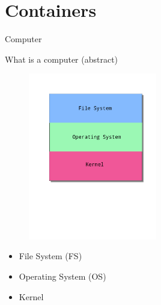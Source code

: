 \documentclass[10pt]{beamer}              %
\begin{document}
\section{Containers}
\begin{frame}[fragile]{Computer}

    What is a computer (abstract)
	\begin{figure} %
    \centering
    \includegraphics[width=0.5\textwidth]{media/images/comp-abstract.png}
    \end{figure}
	\begin{itemize}
		\item File System (FS)
		\item Operating System (OS)
		\item Kernel
	\end{itemize}


\end{frame}
\end{document}
